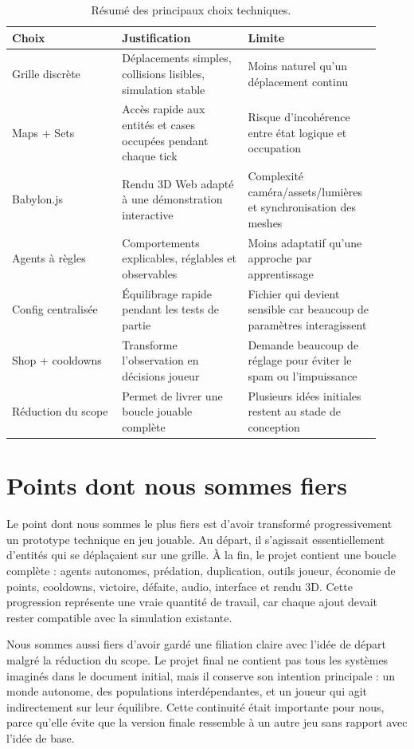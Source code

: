 ﻿\documentclass[11pt,a4paper]{article}
\begin{document}
\begin{table}[h]
\centering
\begin{tabular}{p{0.28\linewidth} p{0.32\linewidth} p{0.32\linewidth}}
\toprule
Choix & Justification & Limite \\
\midrule
Grille discrète & Déplacements simples, collisions lisibles, simulation stable & Moins naturel qu'un déplacement continu \\
Maps + Sets & Accès rapide aux entités et cases occupées pendant chaque tick & Risque d'incohérence entre état logique et occupation \\
Babylon.js & Rendu 3D Web adapté à une démonstration interactive & Complexité caméra/assets/lumières et synchronisation des meshes \\
Agents à règles & Comportements explicables, réglables et observables & Moins adaptatif qu'une approche par apprentissage \\
Config centralisée & Équilibrage rapide pendant les tests de partie & Fichier qui devient sensible car beaucoup de paramètres interagissent \\
Shop + cooldowns & Transforme l'observation en décisions joueur & Demande beaucoup de réglage pour éviter le spam ou l'impuissance \\
Réduction du scope & Permet de livrer une boucle jouable complète & Plusieurs idées initiales restent au stade de conception \\
\bottomrule
\end{tabular}
\caption{Résumé des principaux choix techniques.}
\end{table}

\section{Points dont nous sommes fiers}

Le point dont nous sommes le plus fiers est d'avoir transformé progressivement un prototype technique en jeu jouable. Au départ, il s'agissait essentiellement d'entités qui se déplaçaient sur une grille. À la fin, le projet contient une boucle complète : agents autonomes, prédation, duplication, outils joueur, économie de points, cooldowns, victoire, défaite, audio, interface et rendu 3D. Cette progression représente une vraie quantité de travail, car chaque ajout devait rester compatible avec la simulation existante.

Nous sommes aussi fiers d'avoir gardé une filiation claire avec l'idée de départ malgré la réduction du scope. Le projet final ne contient pas tous les systèmes imaginés dans le document initial, mais il conserve son intention principale : un monde autonome, des populations interdépendantes, et un joueur qui agit indirectement sur leur équilibre. Cette continuité était importante pour nous, parce qu'elle évite que la version finale ressemble à un autre jeu sans rapport avec l'idée de base.
\end{document}
